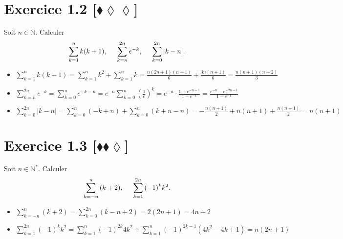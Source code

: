 \documentclass[10pt]{article}
\begin{document}
\section*{Exercice 1.2 [$\blacklozenge\lozenge\lozenge$]}

\begin{tcolorbox}[enhanced, width=7in, center, size=fbox, fontupper=\large, drop shadow southwest]
    Soit $n\in\mathbb{N}$. Calculer
    \begin{equation*}
        \sum\limits^{n}_{k=1}{k(k+1)}, \hspace{0.5cm} \sum\limits^{2n}_{k=n}{e^{-k}}, \hspace{0.5cm} \sum\limits^{2n}_{k=0}{|k-n|}.
    \end{equation*}
    \begin{itemize}
        \item $\sum\limits^n_{k=1}{k(k+1)} = \sum\limits^n_{k=1}{k^2} + \sum\limits^n_{k=1}{k} = \frac{n(2n+1)(n+1)}{6}+\frac{3n(n+1)}{6}=\frac{n(n+1)(n + 2)}{3}$
        \item $\sum\limits^{2n}_{k=n}{e^{-k}} = \sum\limits^{n}_{k=0}{e^{-k-n}}=e^{-n}\sum\limits^{n}_{k=0}{(\frac{1}{e})^k}=e^{-n}\cdot\frac{1-e^{-n-1}}{1-e^{-1}}=\frac{e^{-n}-e^{-2n-1}}{1-e^{-1}}$
        \item $\sum\limits^{2n}_{k=0}{|k-n|}=\sum\limits^{n}_{k=0}{(-k+n)}+\sum\limits^{n}_{k=0}{(k+n-n)}=-\frac{n(n+1)}{2}+n(n+1)+\frac{n(n+1)}{2}=n(n+1)$
    \end{itemize}
\end{tcolorbox}


\section*{Exercice 1.3 [$\blacklozenge\blacklozenge\lozenge$]}

\begin{tcolorbox}[enhanced, width=7in, center, size=fbox, fontupper=\large, drop shadow southwest]
    Soit $n\in\mathbb{N}^*$. Calculer
    \begin{equation*}
        \sum\limits^{n}_{k=-n}{(k+2)}, \hspace{0.5cm} \sum\limits^{2n}_{k=1}{(-1)^kk^2}.
    \end{equation*}
    \begin{itemize}
        \item $\sum\limits^{n}_{k=-n}{(k+2)}=\sum\limits^{2n}_{k=0}{(k-n+2)}=2(2n+1)=4n+2$
        \item $\sum\limits^{2n}_{k=1}{(-1)^kk^2}=\sum\limits^{n}_{k=1}{(-1)^{2k}4k^2}+\sum\limits^{n}_{k=1}{(-1)^{2k-1}(4k^2-4k+1)}=n(2n+1)$
    \end{itemize}
\end{tcolorbox}
\end{document}
